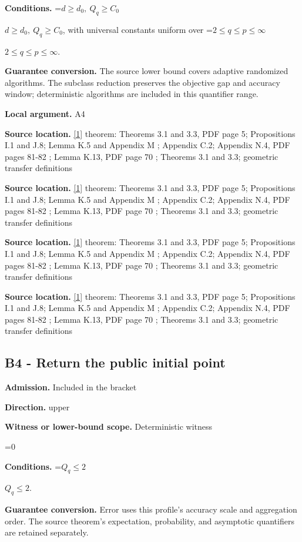 \documentclass[10pt,a4paper]{article}
\newcommand{\AtlasMath}[1]{\par\begingroup\centering\setbox0=\hbox{$\displaystyle #1$}\ifdim\wd0>1.4\linewidth\typeout{ATLAS WIDE FORMULA: \the\wd0}\fi\ifdim\wd0>\linewidth\resizebox{\linewidth}{!}{\box0}\else\box0\fi\par\endgroup}
\newcommand{\AtlasInlineMath}[1]{\begingroup\setbox0=\hbox{$#1$}\ifdim\wd0>.4\linewidth\endgroup\AtlasMath{#1}\else\endgroup$#1$\fi}
\begin{document}
\textbf{Conditions.} \AtlasInlineMath{d\ge d_0,\ Q_q\ge C_0}, with universal constants uniform over \AtlasInlineMath{2\le q\le p\le\infty}.

\textbf{Guarantee conversion.} The source lower bound covers adaptive randomized algorithms. The subclass reduction preserves the objective gap and accuracy window; deterministic algorithms are included in this quantifier range.

\textbf{Local argument.} A4

\textbf{Source location.} \href{https://arxiv.org/html/2610.00345v1}{[1]} theorem: Theorems 3.1 and 3.3, PDF page 5; Propositions I.1 and J.8; Lemma K.5 and Appendix M ; Appendix C.2; Appendix N.4, PDF pages 81-82 ; Lemma K.13, PDF page 70 ; Theorems 3.1 and 3.3; geometric transfer definitions

\textbf{Source location.} \href{https://arxiv.org/html/2610.00345v1}{[1]} theorem: Theorems 3.1 and 3.3, PDF page 5; Propositions I.1 and J.8; Lemma K.5 and Appendix M ; Appendix C.2; Appendix N.4, PDF pages 81-82 ; Lemma K.13, PDF page 70 ; Theorems 3.1 and 3.3; geometric transfer definitions

\textbf{Source location.} \href{https://arxiv.org/html/2610.00345v1}{[1]} theorem: Theorems 3.1 and 3.3, PDF page 5; Propositions I.1 and J.8; Lemma K.5 and Appendix M ; Appendix C.2; Appendix N.4, PDF pages 81-82 ; Lemma K.13, PDF page 70 ; Theorems 3.1 and 3.3; geometric transfer definitions

\textbf{Source location.} \href{https://arxiv.org/html/2610.00345v1}{[1]} theorem: Theorems 3.1 and 3.3, PDF page 5; Propositions I.1 and J.8; Lemma K.5 and Appendix M ; Appendix C.2; Appendix N.4, PDF pages 81-82 ; Lemma K.13, PDF page 70 ; Theorems 3.1 and 3.3; geometric transfer definitions

\subsection{B4 - Return the public initial point}
\textbf{Admission.} Included in the bracket

\textbf{Direction.} upper

\textbf{Witness or lower-bound scope.} Deterministic witness

\AtlasMath{0}
\textbf{Conditions.} \AtlasInlineMath{Q_q\le 2}.

\textbf{Guarantee conversion.} Error uses this profile's accuracy scale and aggregation order. The source theorem's expectation, probability, and asymptotic quantifiers are retained separately.
\end{document}
